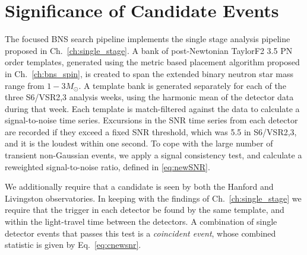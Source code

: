 \section{Significance of Candidate Events}
\label{sec:pipeline}

The focused BNS search pipeline implements the single stage analysis pipeline proposed in Ch.~\ref{ch:single_stage}. A bank of post-Newtonian TaylorF2 3.5 PN order templates, generated using the metric based placement algorithm proposed in Ch.~\ref{ch:bns_spin}, is created to span the extended binary neutron star mass range from $1-3 M_\odot$. A template bank is generated separately for each of the three S6/VSR2,3 analysis weeks, using the harmonic mean of the detector data during that week. Each template is match-filtered against the data to calculate a signal-to-noise time series. Excursions in the SNR time series from each detector are recorded if they exceed a fixed SNR threshold, which was 5.5 in S6/VSR2,3, and it is the loudest within one second. To cope with the large number of transient non-Gaussian events, we apply a signal consistency test, and calculate a reweighted signal-to-noise ratio, defined in \ref{eq:newSNR}.

We additionally require that a candidate is seen by both the Hanford and Livingston observatories. In keeping with the findings of Ch.~\ref{ch:single_stage} we require that the trigger in each detector be found by the same template, and within the light-travel time between the detectors. A combination of single detector events that passes this test is a \emph{coincident event}, whose combined statistic is given by Eq.~\ref{eq:cnewsnr}.

